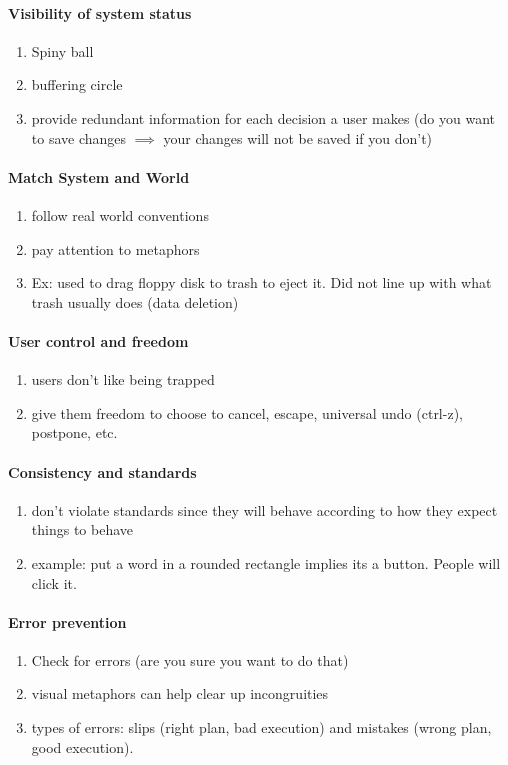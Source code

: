 \paragraph{Visibility of system status}
\begin{enumerate}
    \item Spiny ball
    \item buffering circle
    \item provide redundant information for each decision a user makes (do you want to save changes $\implies$ your changes will not be saved if you don't)
\end{enumerate}

\paragraph{Match System and World}
\begin{enumerate}    
\item follow real world conventions
\item pay attention to metaphors
\item Ex: used to drag floppy disk to trash to eject it. Did not line up with what trash usually does (data deletion)
\end{enumerate}

\paragraph{User control and freedom}
\begin{enumerate}
    \item users don't like being trapped
    \item give them freedom to choose to cancel, escape, universal undo (ctrl-z), postpone, etc.
 
\end{enumerate}

\paragraph{Consistency and standards}
\begin{enumerate}
    \item don't violate standards since they will behave according to how they expect things to behave
    \item example: put a word in a rounded rectangle implies its a button. People will click it.
\end{enumerate}

\paragraph{Error prevention}
\begin{enumerate}
    \item Check for errors (are you sure you want to do that)
    \item visual metaphors can help clear up incongruities
    \item types of errors: slips (right plan, bad execution) and mistakes (wrong plan, good execution). 
\end{enumerate}

